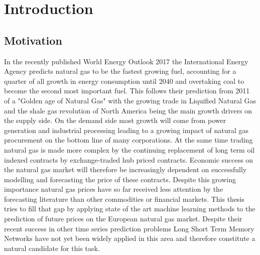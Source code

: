\chapter{Introduction}
\section{Motivation}
In the recently published World Energy Outlook 2017 the International Energy Agency predicts natural gas to be the fastest growing fuel, accounting for a quarter of all growth in energy consumption until 2040 and overtaking coal to become the second most important fuel. This follows their prediction from 2011 of a "Golden age of Natural Gas" with the growing trade in Liquified Natural Gas and the shale gas revolution of North America being the main growth drivers on the supply side. On the demand side most growth will come from power generation and industrial processing leading to a growing impact of natural gas procurement on the bottom line of many corporations.  At the same time trading natural gas is made more complex by the continuing replacement of long term oil indexed contracts by exchange-traded hub priced contracts. Economic success on the natural gas market will therefore be increasingly dependent on successfully modelling and forecasting the price of these contracts. Despite this growing importance natural gas prices have so far received less attention by the forecasting literature than other commodities or financial markets. This thesis tries to fill that gap by applying state of the art machine learning methods to the prediction of future prices on the European natural gas market. Despite their recent success in other time series prediction problems Long Short Term Memory Networks have not yet been widely applied in this area and therefore constitute a natural candidate for this task. 
